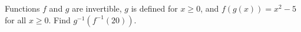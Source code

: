 Functions $f$ and $g$ are invertible, $g$ is defined for $x\ge0$, and $f(g(x))=x^2-5$ for all $x\ge0$. Find $g^{-1}\left(f^{-1}(20)\right)$.
